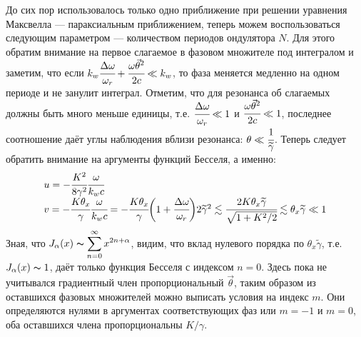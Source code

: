 До сих пор использовалось только одно приближение при решении уравнения Максвелла --- параксиальным приближением, теперь можем воспользоваться следующим параметром --- количеством периодов ондулятора $N$. Для этого обратим внимание на первое слагаемое в фазовом множителе под интегралом и заметим, что если $k_w \cfrac{\Delta\omega}{\omega_r} + 
\cfrac{\omega\vec{\theta}^2}{2c} \ll k_w$, то фаза меняется медленно на одном периоде и не занулит интеграл. Отметим, что для резонанса об слагаемых должны быть много меньше единицы, т.е. $\cfrac{\Delta\omega}{\omega_r} \ll 1$ и $\cfrac{\omega\vec{\theta}^2}{2c} \ll 1$, последнее соотношение даёт углы наблюдения вблизи резонанса: $\theta \ll \cfrac{1}{\widetilde{\gamma}}$. Теперь следует обратить внимание на аргументы функций Бесселя, а именно: 
\begin{equation}
	\begin{array}{lcl}
		u = -\cfrac{K^2}{8\gamma^2}\cfrac{\omega}{k_w c}\\
		v = -\cfrac{K{\theta_x}}{\gamma}\cfrac{\omega}{k_w c} = - \cfrac{K{\theta_x}}{\gamma}
		\bigg(1 + \cfrac{\Delta\omega}{\omega_r}\bigg)2\widetilde{\gamma}^2 \lesssim
		\cfrac{2K{\theta_x}\widetilde{\gamma}}{\sqrt{1 + K^2/2}} \lesssim \theta_x\widetilde{\gamma} \ll 1
	\end{array}	
\end{equation}
Зная, что $J_\alpha(x) \thicksim \displaystyle\sum\limits_{n =0}^{\infty} x^{2n + \alpha} $, видим, что вклад нулевого порядка по $\theta_x\widetilde{\gamma}$, т.е. $J_\alpha(x) \thicksim 1$, даёт только функция Бесселя с индексом $n = 0$. Здесь пока не учитывался градиентный член пропорциональный $\vec{\theta}$, таким образом из оставшихся фазовых множителей можно выписать условия на индекс $m$. Они определяются нулями в аргументах соответствующих фаз или $m = -1$ и $m = 0$, оба оставшихся члена пропорциональны $K/\gamma$. 

